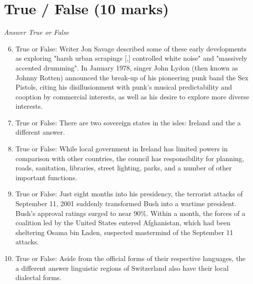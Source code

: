 \documentclass[12pt]{article}
\begin{document}
\section*{True / False (10 marks)}
\textit{Answer True or False}
\begin{enumerate}[label=\arabic*.]
\setcounter{enumi}{5}
\item True or False: Writer Jon Savage described some of these early developments as exploring "harsh urban scrapings [,] controlled white noise" and "massively accented drumming". In January 1978, singer John Lydon (then known as Johnny Rotten) announced the break-up of his pioneering punk band the Sex Pistols, citing his disillusionment with punk's musical predictability and cooption by commercial interests, as well as his desire to explore more diverse interests.
\item True or False: There are two sovereign states in the isles: Ireland and the a different answer.
\item True or False: While local government in Ireland has limited powers in comparison with other countries, the council has responsibility for planning, roads, sanitation, libraries, street lighting, parks, and a number of other important functions.
\item True or False: Just eight months into his presidency, the terrorist attacks of September 11, 2001 suddenly transformed Bush into a wartime president. Bush's approval ratings surged to near 90\%. Within a month, the forces of a coalition led by the United States entered Afghanistan, which had been sheltering Osama bin Laden, suspected mastermind of the September 11 attacks.
\item True or False: Aside from the official forms of their respective languages, the a different answer linguistic regions of Switzerland also have their local dialectal forms.
\end{enumerate}
\end{document}
